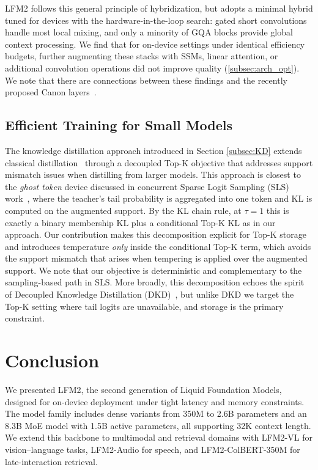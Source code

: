 \documentclass{article}
\begin{document}
LFM2 follows this general principle of hybridization, but adopts a minimal hybrid tuned for devices with the hardware-in-the-loop search: gated short convolutions handle most local mixing, and only a minority of GQA blocks provide global context processing. We find that for on-device settings under identical efficiency budgets, further augmenting these stacks with SSMs, linear attention, or additional convolution operations did not improve quality (\ref{subsec:arch_opt}). We note that there are connections between these findings and the recently proposed Canon layers~\citep{allen-zhu2025physics}.



\subsection{Efficient Training for Small Models}
\label{subsec:rel_work_distill}
The knowledge distillation approach introduced in Section \ref{subsec:KD} extends classical distillation~\citep{hinton2015distilling}  through a decoupled Top-K objective that addresses support mismatch issues when distilling from larger models. This approach is closest to the \emph{ghost token} device discussed in concurrent Sparse Logit Sampling (SLS) work~\citep{anshumann2025sparse}, where the teacher’s tail probability is aggregated into one token and KL is computed on the augmented support. By the KL chain rule, at $\tau=1$ this is exactly a binary membership KL plus a conditional Top-K KL as in our approach. Our contribution makes this decomposition explicit for Top-K storage and introduces temperature \emph{only} inside the conditional Top-K term, which avoids the support mismatch that arises when tempering is applied over the augmented support. We note that our objective is deterministic and complementary to the sampling-based path in SLS. More broadly, this decomposition echoes the spirit of Decoupled Knowledge Distillation (DKD)~\citep{zhao2022decoupled}, but unlike DKD we target the Top-K setting where tail logits are unavailable, and storage is the primary constraint. 



\section{Conclusion}
\label{sec:conclusion}
We presented LFM2, the second generation of Liquid Foundation Models, designed for on-device deployment under tight latency and memory constraints. The model family includes dense variants from 350M to 2.6B parameters and an 8.3B MoE model with 1.5B active parameters, all supporting 32K context length. We extend this backbone to multimodal and retrieval domains with LFM2-VL for vision–language tasks, LFM2-Audio for speech, and LFM2-ColBERT-350M for late-interaction retrieval. 
\end{document}
